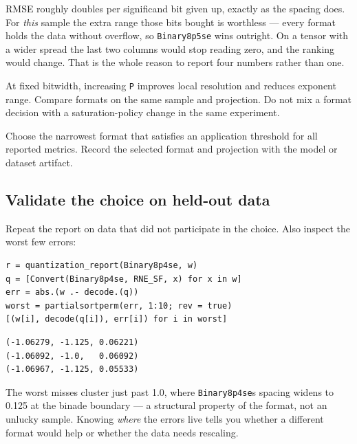 RMSE roughly doubles per significand bit given up, exactly as the spacing does. For \emph{this} sample the extra range those bits bought is worthless — every format holds the data without overflow, so \texttt{Binary8p5se} wins outright. On a tensor with a wider spread the last two columns would stop reading zero, and the ranking would change. That is the whole reason to report four numbers rather than one.



At fixed bitwidth, increasing \texttt{P} improves local resolution and reduces exponent range. Compare formats on the same sample and projection. Do not mix a format decision with a saturation-policy change in the same experiment.



Choose the narrowest format that satisfies an application threshold for all reported metrics. Record the selected format and projection with the model or dataset artifact.



\subsection{Validate the choice on held-out data}



\label{12502924272145546039}{}


Repeat the report on data that did not participate in the choice. Also inspect the worst few errors:




\nopagebreak[4]
\begin{minipage}{\linewidth}
\begin{verbatim}
r = quantization_report(Binary8p4se, w)
q = [Convert(Binary8p4se, RNE_SF, x) for x in w]
err = abs.(w .- decode.(q))
worst = partialsortperm(err, 1:10; rev = true)
[(w[i], decode(q[i]), err[i]) for i in worst]
\end{verbatim}




\begin{verbatim}
(-1.06279, -1.125, 0.06221)
(-1.06092, -1.0,   0.06092)
(-1.06967, -1.125, 0.05533)
\end{verbatim}
\end{minipage}




The worst misses cluster just past 1.0, where \texttt{Binary8p4se}{\textquotesingle}s spacing widens to 0.125 at the binade boundary — a structural property of the format, not an unlucky sample. Knowing \emph{where} the errors live tells you whether a different format would help or whether the data needs rescaling.



